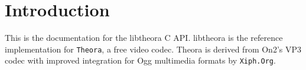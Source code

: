 \section{Introduction}\label{index_intro}
This is the documentation for the libtheora C API. libtheora is the reference implementation for {\tt Theora}, a free video codec. Theora is derived from On2's VP3 codec with improved integration for Ogg multimedia formats by {\tt Xiph.Org}. 